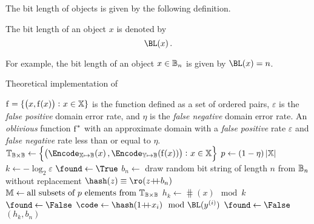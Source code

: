 \documentclass[ ../main.tex]{subfiles}
\begin{document}
The bit length of objects is given by the following definition.
\begin{definition}
The bit length of an object $x$ is denoted by
\begin{equation}
    \BL(x)\,.
\end{equation}
\end{definition}
For example, the bit length of an object $x \in \mathbb{B}_n$ is given by $\BL(x) = n$.

\begin{algorithm}[h]
    \caption{Theoretical implementation of \protect\MakeApproxMap}
    \label{alg:shmap}
    \KwIn
    {
        $\operatorname{f} = \{\left(x,\operatorname{f}(x)\right) \colon x \in \mathbb{X} \}$ is the function defined as a set of ordered pairs, $\varepsilon$ is the \emph{false positive} domain error rate, and $\eta$ is the \emph{false negative} domain error rate.
    }
    \KwOut
    {
        An \emph{oblivious} function $\operatorname{f}^*$ with an approximate domain with a \emph{false positive} rate $\varepsilon$ and \emph{false negative} rate less than or equal to $\eta$.
    }
    \func{\MakeApproxMap{$\Fun$, $\varepsilon$}}
    {
        $\Mt_{\cisb \times \cisb} \gets \left\{\left(\Encode_{\X \mapsto \cisb}\!\left(x\right),\Encode_{\Y \mapsto \cisb}(\Fun(x))\right) \colon x \in \X\right\}$\;
        $p \gets (1 - \eta) \left\vert{\mathbb{X}}\right\vert$\;
        $k \gets -\log_2 \varepsilon$\;
        {
            $\found \gets \True$\;
            {
                $b_n \gets$ draw random bit string of length $n$ from $\mathbb{B}_n$ without replacement\;
                $\hash(z) \equiv \ro(z \catop b_n)$\;
                $\mathbb{M} \gets \text{all subsets of $p$ elements from $\mathbb{T}_{\mathbb{B} \times \mathbb{B}}$}$\;
                {
                    $h_k \gets \hash(x) \mod k$\;
                    {
                        {
                            $\found \gets \False$\;
                        }
                        $\code \gets \hash(1 \catop x_i) \mod \BL(y^{(i)})$\;
                        {
                            \label{line:selfterm}
                            $\found \gets \False$\;
                        }
                    }
                    \If{\found}
                    {
                        \Return $(h_k,b_n)$\;
                    }
                }
            }
        }
    }
\end{algorithm}
\end{document}
